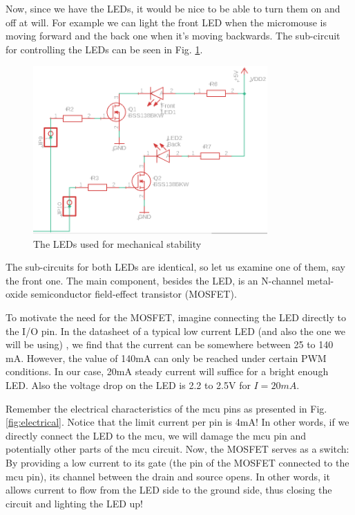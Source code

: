 Now, since we have the LEDs, it would be nice to be able to turn them on and off at will. For example we can light the front LED when the micromouse is moving forward and the back one when it's moving backwards.
The sub-circuit for controlling the LEDs can be seen in Fig. \ref{fig:leds}.

\begin{figure}[htb]
    \centering
    \includegraphics[width=0.8\textwidth]{figures/hardware/LEDs.PNG}
    \caption{The LEDs used for mechanical stability}
    \label{fig:leds}
\end{figure}
\FloatBarrier

The sub-circuits for both LEDs are identical, so let us examine one of them, say the front one. The main component, besides the LED, is an N-channel metal-oxide semiconductor field-effect transistor (MOSFET).

To motivate the need for the MOSFET, imagine connecting the LED directly to the I/O pin. In the datasheet of a typical low current LED (and also the one we will be using) \cite{leds}, we find that the current can be somewhere between 25 to 140 mA. However, the value of 140mA can only be reached under certain PWM conditions. In our case, 20mA steady current will suffice for a bright enough LED. Also the voltage drop on the LED is 2.2 to 2.5V for $I = 20mA$.

Remember the electrical characteristics of the mcu pins as presented in Fig. \ref{fig:electrical}. Notice that the limit current per pin is 4mA! In other words, if we directly connect the LED to the mcu, we will damage the mcu pin and potentially other parts of the mcu circuit. 
Now, the MOSFET serves as a switch: By providing a low current to its gate (the pin of the MOSFET connected to the mcu pin), its channel between the drain and source opens. In other words, it allows current to flow from the LED side to the ground side, thus closing the circuit and lighting the LED up! 

